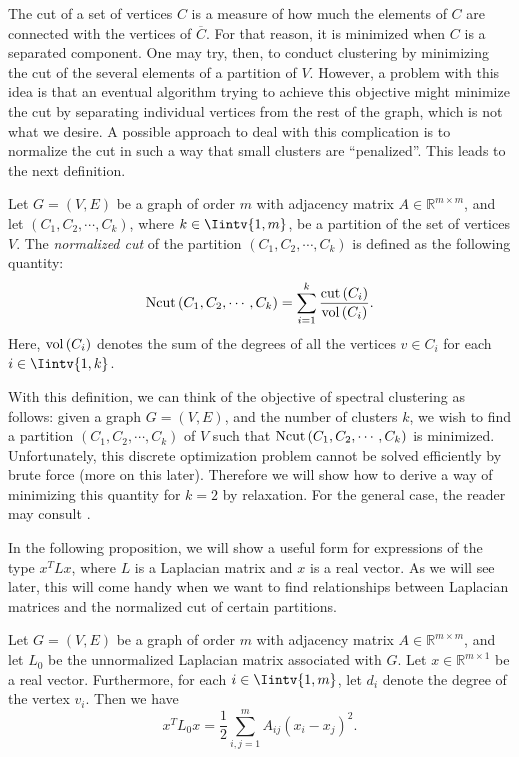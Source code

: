 The cut of a set of vertices $C$ is a measure of how much the elements of $C$ are connected with the vertices of $\overline C$.
For that reason, it is minimized when $C$ is a separated component. 
One may try, then, to conduct clustering by minimizing the cut of the several elements of a partition of $V$.
However, a problem with this idea is that an eventual algorithm trying to achieve this objective might minimize the cut by separating individual vertices from the rest of the graph, which is not what we desire.
A possible approach to deal with this complication is to normalize the cut in such a way that small clusters are ``penalized''.
This leads to the next definition.

\begin{definition}
   Let $G = (V,E)$ be a graph of order $m$ with adjacency matrix $A \in \mathbb R^{m \times m}$, and let $(C_1, C_2, \cdots, C_k)$, where $k \in \Iintv{1,m}$, be a partition of the set of vertices $V$.
   The \textit{normalized cut} of the partition $(C_1, C_2, \cdots, C_k)$ is defined as the following quantity:
   \begin{equation}
      \operatorname*{Ncut\,} (C_1, C_2, \cdots, C_k) = \sum _{i = 1}^k \frac{\operatorname{cut\,} (C_i)}{\operatorname*{vol\,}(C_i)}.
   \end{equation}
   Here, $\operatorname*{vol\,} (C_i)$ denotes the sum of the degrees of all the vertices $v \in C_i$ for each $i \in \Iintv{1,k}$.
\end{definition}

With this definition, we can think of the objective of spectral clustering as follows: given a graph $G=(V,E)$, and the number of clusters $k$, we wish to find a partition $(C_1, C_2, \cdots, C_k)$ of $V$ such that $\operatorname*{Ncut\,} (C_1, C_2, \cdots, C_k)$ is minimized. Unfortunately, this discrete optimization problem cannot be solved efficiently by brute force (more on this later). Therefore we will show how to derive a way of minimizing this quantity for $k = 2$ by relaxation. For the general case, the reader may consult \cite{tutorial}.

In the following proposition, we will show a useful form for expressions of the type $x^TLx$, where $L$ is a Laplacian matrix and $x$ is a real vector.
As we will see later, this will come handy when we want to find relationships between Laplacian matrices and the normalized cut of certain partitions.

\begin{proposition}\label{xtlx}
   Let $G = (V,E)$ be a graph of order $m$ with adjacency matrix $A \in \mathbb R^{m \times m}$, and let $L_0$ be the unnormalized Laplacian matrix associated with $G$. Let $x \in \mathbb R^{m \times 1}$ be a real vector. Furthermore, for each $i \in \Iintv{1,m}$, let $d_i$ denote the degree of the vertex $v_i$. Then we have
   \begin{equation}
      x^TL_0x = \frac{1}{2}\sum_{i,j = 1}^m A_{ij} \left( x_i - x_j \right)^2.
   \end{equation}
\end{proposition}

